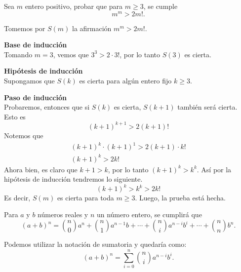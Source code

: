 \begin{example}
    Sea $m$ entero positivo, probar que para $m \geq 3$, se cumple \[m^m > 2m!.\]
\end{example}

\begin{solution}
    Tomemos por $S(m)$ la afirmación $m^m > 2m!$.

    \textbf{Base de inducción}\\
    Tomando $m = 3$, vemos que $3^3 > 2\cdot3!$, por lo tanto $S(3)$ es cierta.

    \textbf{Hipótesis de inducción}\\
    Supongamos que $S(k)$ es cierta para algún entero fijo $k\geq 3$.

    \textbf{Paso de inducción}\\
    Probaremos, entonces que si $S(k)$ es cierta, $S(k + 1)$ también será cierta.
    Esto es
    \[(k + 1)^{k + 1} > 2(k + 1)!\]
    Notemos que
    \begin{gather*}
        (k + 1)^{k}\cdot(k + 1)^1 > 2(k + 1)\cdot k!\\
        (k + 1)^k > 2k!
    \end{gather*}
    Ahora bien, es claro que $k + 1 > k$, por lo tanto $(k + 1)^k > k^k$.
    Así por la hipótesis de inducción tendremos lo siguiente.
    \[(k + 1)^k > k^k > 2k!\]
    Es decir, $S(m)$ es cierta para toda $m\geq 3$.
    Luego, la prueba está hecha.
\end{solution}

\begin{theorem}
    Para $a$ y $b$ números reales y $n$ un número entero, se cumplirá que
    \[(a + b)^n = \binom{n}{0}a^n + \binom{n}{1}a^{n - 1}b + \cdots + \binom{n}{i}a^{n - i}b^i + \cdots + \binom{n}{n}b^n.\]
\end{theorem}

Podemos utilizar la notación de sumatoria y quedaría como:
\[(a + b)^n = \sum\limits_{i = 0}^{n} \binom{n}{i}a^{n - i}b^i.\]

